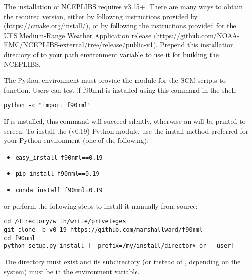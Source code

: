 The installation of NCEPLIBS requires  v3.15+. There are many ways to obtain the required version, either by following instructions provided by  (\url{https://cmake.org/install/}), or by following the instructions provided for the UFS Medium-Range Weather Application release (\url{https://github.com/NOAA-EMC/NCEPLIBS-external/tree/release/public-v1}). Prepend this installation directory of  to your path environment variable to use it for building the NCEPLIBS.

The Python environment must provide the  module for the SCM scripts to function. Users can test if f90nml is installed using this command in the shell:
\begin{lstlisting}
python -c "import f90nml"
\end{lstlisting}
If  is installed, this command will succeed silently, otherwise an  will be printed to screen. To install the  (v0.19) Python module, use the install method preferred for your Python environment (one of the following):
\begin{itemize}
\item
\begin{lstlisting}
easy_install f90nml==0.19
\end{lstlisting}
\end{itemize}
\begin{itemize}
\item
\begin{lstlisting}
pip install f90nml==0.19
\end{lstlisting}
\end{itemize}
\begin{itemize}
\item
\begin{lstlisting}
conda install f90nml=0.19
\end{lstlisting}
\end{itemize}

or perform the following steps to install it manually from source:
\begin{lstlisting}
cd /directory/with/write/priveleges
git clone -b v0.19 https://github.com/marshallward/f90nml
cd f90nml
python setup.py install [--prefix=/my/install/directory or --user]
\end{lstlisting}
The directory  must exist and its subdirectory  (or  instead of , depending on the system) must be in the  environment variable.

